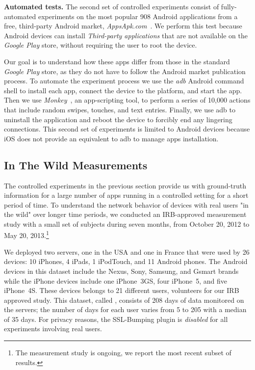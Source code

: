 \noindent\textbf{Automated tests.} The second set of controlled experiments consist of fully-automated
experiments on the most popular 908 Android applications from a free,
third-party Android market, \emph{AppsApk.com}~\cite{appsapk}.
We perform this test because Android devices can install
\emph{Third-party applications} that are not available on the
\emph{Google Play} store, without requiring the user to root the device. 

Our goal is to understand how these apps differ from those in the standard \emph{Google Play} 
store, as they do not have to follow the Android market publication
process. To
automate the experiment process we use the \emph{adb} Android command shell to
install each app, connect the device to the \platname{} platform, and
start the app. Then we use \emph{Monkey}~\cite{adbmonkey}, an app-scripting 
tool, to perform a series of 10,000 actions that include
random swipes, touches, and text entries.  Finally, we use adb to
uninstall the application and reboot the device to forcibly end any
lingering connections. This second set of experiments is limited to
Android devices because iOS does not provide an equivalent to adb to
manage apps installation. 


\subsection{In The Wild Measurements}
\label{sec:dataset-wild-measurements}

The controlled experiments in the previous section provide us with 
ground-truth information for a large number of apps running in a controlled 
setting for a short period of time. To understand the network behavior of 
devices with real users "in the wild" over longer time periods, we conducted 
an IRB-approved measurement study with a small set of subjects during seven months, from 
October 20, 2012 to May 20, 2013.\footnote{The measurement study is ongoing, we report the most recent subset of results.}

We deployed two \platname servers, one in the USA and one in France
that were used by 26 devices: 10 iPhones, 4 iPads, 1 iPodTouch, and 11
Android phones.  The Android devices in this dataset include the
Nexus, Sony, Samsung, and Gsmart brands while the iPhone devices
include one iPhone~3GS, four iPhone~5, and five iPhone~4S.  These
devices belongs to 21 different users, volunteers for our IRB approved
study.  This dataset, called \mobWild, consists of 208 days of data
monitored on the \platname{} servers; the number of days for each user
varies from 5 to 205 with a median of 35 days.  For privacy reasons, the
SSL-Bumping plugin is \emph{disabled} for all experiments involving
real users.

